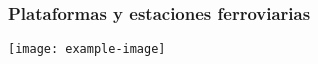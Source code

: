 \subsubsection{Plataformas y estaciones ferroviarias}

\lipsum[1]

\lipsum[1]
\texttt{[image: example-image]}
\lipsum[1]
